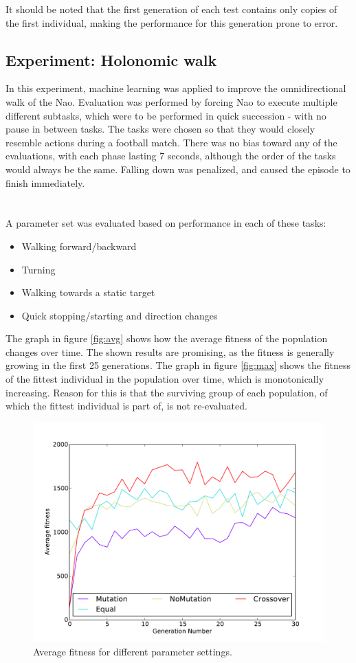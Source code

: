 \documentclass{article}
\begin{document}
It should be noted that the first generation of each test contains only copies of the first individual, making 
the performance for this generation prone to error. 


\subsection{Experiment: Holonomic walk}
In this experiment, machine learning was applied to improve the omnidirectional walk of the Nao. Evaluation was performed by forcing Nao to execute multiple different subtasks, which were to be performed in quick succession - with no pause in between tasks. The tasks were chosen so that they would closely resemble actions during a football match. There was no bias toward any of the evaluations, with each phase lasting 7 seconds, although the order of the tasks would always be the same. Falling down was penalized, and caused the episode to finish immediately. \\\\\\

A parameter set was evaluated based on performance in each of these tasks:
\begin{itemize}
\item Walking forward/backward
\item Turning
\item Walking towards a static target
\item Quick stopping/starting and direction changes
\end{itemize}

The graph in figure \ref{fig:avg} shows how the average fitness of the population changes over time. The shown results are promising, as the fitness is generally growing in the first 25 generations. The graph in figure \ref{fig:max} shows the fitness of the fittest individual in the population over time, which is monotonically increasing. Reason for this is that the surviving group of each population, of which the fittest individual is part of, is not re-evaluated. 

\begin{figure}[h!]
	\center
	\includegraphics[width=.65\textwidth]{images/relevant_avg.pdf}
	\caption{Average fitness for different parameter settings.}
	\label{fig:avgforward}
\end{figure}
\end{document}
